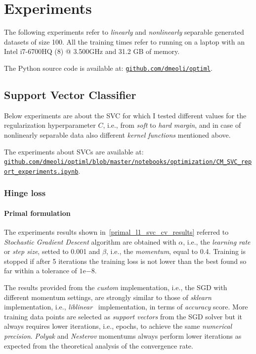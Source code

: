 \section{Experiments}

The following experiments refer to \emph{linearly} and \emph{nonlinearly} separable generated datasets of size 100. All the training times refer to running on a laptop with an Intel i7-6700HQ (8) @ 3.500GHz and 31.2 GB of memory.

The Python source code is available at: \href{https://github.com/dmeoli/optiml}{\texttt{github.com/dmeoli/optiml}}.

\subsection{Support Vector Classifier}

Below experiments are about the SVC for which I tested different values for the regularization hyperparameter $C$, i.e., from \emph{soft} to \emph{hard margin}, and in case of nonlinearly separable data also different \emph{kernel functions} mentioned above.

The experiments about SVCs are available at: \\ \href{https://github.com/dmeoli/optiml/blob/master/notebooks/optimization/CM_SVC_report_experiments.ipynb}{\texttt{github.com/dmeoli/optiml/blob/master/notebooks/optimization/CM\_SVC\_report\_experiments.ipynb}}.

\subsubsection{Hinge loss}

\paragraph{Primal formulation}

The experiments results shown in~\ref{primal_l1_svc_cv_results} referred to \emph{Stochastic Gradient Descent} algorithm are obtained with $\alpha$, i.e., the \emph{learning rate} or \emph{step size}, setted to 0.001 and $\beta$, i.e., the \emph{momentum}, equal to 0.4. Training is stopped if after 5 iterations the training loss is not lower than the best found so far within a tolerance of $1\mathrm{e}{-8}$.



The results provided from the \emph{custom} implementation, i.e., the SGD with different momentum settings, are strongly similar to those of \emph{sklearn} implementation, i.e., \emph{liblinear}~\cite{fan2008liblinear} implementation, in terms of \emph{accuracy} score. More training data points are selected as \emph{support vectors} from the SGD solver but it always requires lower iterations, i.e., epochs, to achieve the same \emph{numerical precision}. \emph{Polyak} and \emph{Nesterov} momentums always perform lower iterations as expected from the theoretical analysis of the convergence rate.

